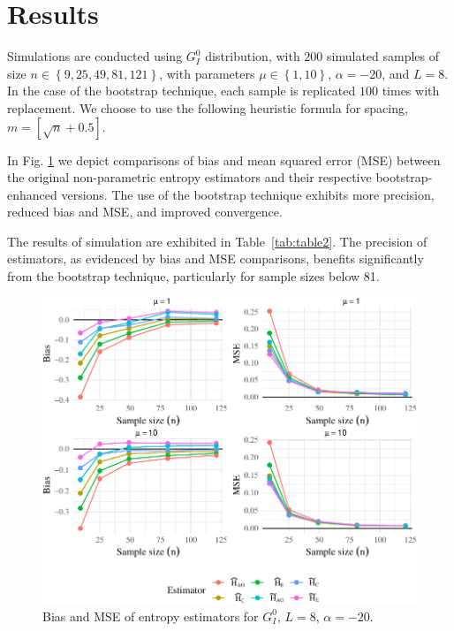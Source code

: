 \documentclass[conference,final,]{IEEEtran}
\begin{document}
\hypertarget{sec:results}{%
\section{Results}\label{sec:results}}

Simulations are conducted using \(G_I^0\) distribution, with \(200\)
simulated samples of size \(n\in\left\{9, 25, 49, 81, 121\right\}\),
with parameters \(\mu \in \left\{1, 10\right\}\), \(\alpha=-20\), and
\(L=8\). In the case of the bootstrap technique, each sample is
replicated \(100\) times with replacement. We choose to use the
following heuristic formula for spacing,
\(m=\left[\sqrt{n}+0.5\right]\).

In Fig. \ref{fig:Plot_bias_mse_gi0} we depict comparisons of bias and
mean squared error (MSE) between the original non-parametric entropy
estimators and their respective bootstrap-enhanced versions. The use of
the bootstrap technique exhibits more precision, reduced bias and MSE,
and improved convergence.

The results of simulation are exhibited in Table~\ref{tab:table2}. The
precision of estimators, as evidenced by bias and MSE comparisons,
benefits significantly from the bootstrap technique, particularly for
sample sizes below 81.

\begin{figure}

{\centering \includegraphics[width=1\linewidth]{R1-The-Entropy-as-a-Proxy-for-Fully-Developed-Speckle_files/figure-latex/Plot_bias_mse_gi0-1} 

}

\caption{Bias and MSE of entropy estimators for  $G_I^0$, $L=8$, $\alpha=-20$.}\label{fig:Plot_bias_mse_gi0}
\end{figure}
\end{document}

